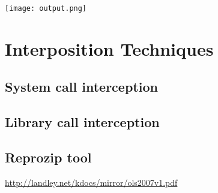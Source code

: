 \begin{center}
\texttt{[image: output.png]}
\label{fig:output}
\end{center}

\section{Interposition Techniques}
\subsection{System call interception}
\subsection{Library call interception}
\subsection{Reprozip tool}
\hyperref[System Call Interception]{http://landley.net/kdocs/mirror/ols2007v1.pdf}

